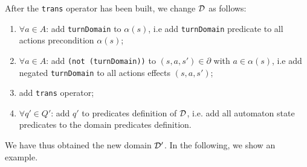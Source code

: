 After the \texttt{trans} operator has been built, we change $\mathcal{D}$ as follows:
\begin{enumerate}
\item $\forall a \in A$: add \texttt{turnDomain} to $\alpha(s)$, i.e add \texttt{turnDomain} predicate to all actions precondition $\alpha(s)$;
\item $\forall a \in A$: add \texttt{(not (turnDomain))} to $(s,a,s') \in \partial$ with $a \in \alpha(s)$, i.e add negated \texttt{turnDomain} to all actions effects $(s,a,s')$;
\item add \texttt{trans} operator;
\item $\forall q' \in Q'$: add $q'$ to predicates definition of $\mathcal{D}$, i.e. add all automaton state predicates to the domain predicates definition.
\end{enumerate}

\noindent We have thus obtained the new domain $\mathcal{D}'$. In the following, we show an example.

